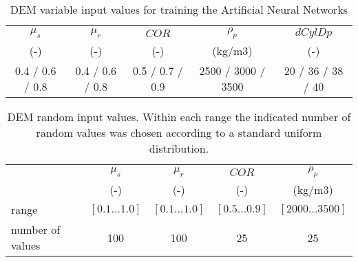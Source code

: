 \documentclass{llncs}
\begin{document}
\begin{table}[h]
\centering
\begin{tabular}{ccccc}
\hline
    $\mu_s$ & $\mu_r$ & $COR$ & $\rho_p$ & $dCylDp$ \\
    	(-)  & (-)   & (-)   & (kg/m3) & (-) \\
    \hline
    0.4 / 0.6 / 0.8 & 0.4 / 0.6 / 0.8 & 0.5 / 0.7 / 0.9 & 2500 / 3000 / 3500 & 20 / 36 / 38 / 40 \\

\hline
\end{tabular}
\caption[DEM variable input values]{DEM variable input values for training the
Artificial Neural Networks}
\label{tab:10DEMVariableinputvalues}
\end{table}
\begin{table}[h]
\centering
\begin{tabular}{lcccc}
\hline
 &  $\mu_s$ & $\mu_r$ & $COR$ & $\rho_p$  \\
   &	(-)  & (-)   & (-)   & (kg/m3) \\
          \hline
    range & $[0.1 \ldots 1.0]$ & $[0.1 \ldots 1.0]$ & $[0.5 \ldots 0.9]$ &
    $[2000 \ldots 3500]$     \\
    number of values & 100   & 100   & 25    & 25    \\

\hline
\end{tabular}
\caption[DEM random input values]{DEM random input values. Within each range the
indicated number of random values was chosen according to a standard uniform
distribution.}
\label{tab:12DEMRandominputvalues}
\end{table}
\end{document}
